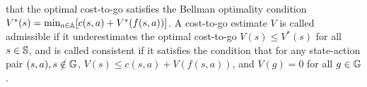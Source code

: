 that the optimal cost-to-go satisfies the Bellman optimality condition
$V^*(s) = \min_{a \in \mathbb{A}} [c(s, a) + V^*(f(s, a))]$.
A cost-to-go estimate $V$ is
called admissible if it underestimates the optimal cost-to-go
$V(s) \leq V^*(s)$ for all $s \in \mathbb{S}$, and
is called consistent if it satisfies the condition that for any
state-action pair $(s, a), s\notin\mathbb{G}$, $V(s) \leq c(s, a) + V(f(s, a))$, and $V(g) = 0$ for
all $g \in \mathbb{G}$.

